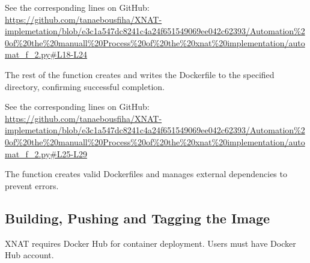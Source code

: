 \lstset{style=allblack}


\normalsize
\lstset{inputpath=en/content}



\noindent\footnotesize{ See the corresponding lines on GitHub:\url{ https://github.com/tanaebousfiha/XNAT-implemetation/blob/e3c1a547dc8241c4a24f651549069ee042c62393/Automation%20of%20the%20manuall%20Process%20of%20the%20xnat%20implementation/automat_f_2.py#L18-L24}}

\normalsize


The rest of the function creates and writes the Dockerfile to the specified directory, confirming successful completion.






\noindent\footnotesize See the corresponding lines on GitHub:\url{ https://github.com/tanaebousfiha/XNAT-implemetation/blob/e3c1a547dc8241c4a24f651549069ee042c62393/Automation%20of%20the%20manuall%20Process%20of%20the%20xnat%20implementation/automat_f_2.py#L25-L29}
\normalsize






The function creates valid Dockerfiles and manages external dependencies to prevent errors.

\subsection{Building, Pushing and Tagging the Image}

XNAT requires Docker Hub for container deployment. Users must have Docker Hub account. 



